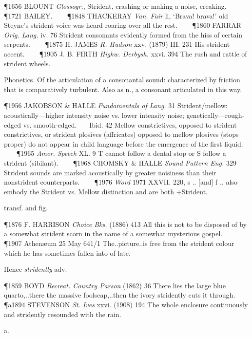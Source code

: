 \begin{description}[wide, labelwidth=!, labelindent=0pt]
\begin{myenumerate}
\P 1656 BLOUNT  \textit{Glossogr.}, Strident, crashing or making a noise, creaking.    
\P 1721 BAILEY.    
\P 1848 THACKERAY  \textit{Van. Fair} li, ‘Brava! brava!’ old Steyne's strident voice was heard roaring over all the rest.    
\P 1860 FARRAR  \textit{Orig. Lang.} iv. 76 Strident consonants evidently formed from the hiss of certain serpents.    
\P 1875 H. JAMES  \textit{R. Hudson} xxv. (1879) III. 231 His strident accent.    
\P 1905 J. B. FIRTH  \textit{Highw. Derbysh.} xxvi. 394 The rush and rattle of strident wheels.

 Phonetics. Of the articulation of a consonantal sound: characterized by friction that is comparatively turbulent. Also as n., a consonant articulated in this way.

\P 1956 JAKOBSON \& HALLE  \textit{Fundamentals of Lang.} 31 Strident/mellow: acoustically—higher intensity noise vs. lower intensity noise; genetically—rough-edged vs. smooth-edged.    Ibid. 42 Mellow constrictives, opposed to strident constrictives, or strident plosives (affricates) opposed to mellow plosives (stops proper) do not appear in child language before the emergence of the first liquid.    
\P 1965  \textit{Amer. Speech} XL. 9 T cannot follow a dental stop or S follow a strident (sibilant).    
\P 1968 CHOMSKY \& HALLE  \textit{Sound Pattern Eng.} 329 Strident sounds are marked acoustically by greater noisiness than their nonstrident counterparts.    
\P 1976 \textit{Word} 1971 XXVII.  220, s .. [and] f .. also embody the Strident vs. Mellow distinction and are both +Strident.

 transf. and fig.

\P 1876 F. HARRISON  \textit{Choice Bks.} (1886) 413 All this is not to be disposed of by a somewhat strident scorn in the name of a somewhat mysterious gospel.    
\P 1907 Athenæum  25 May 641/1 The..picture..is free from the strident colour which he has sometimes fallen into of late.

\noindent Hence \textit{stridently} adv.

\P 1859 BOYD  \textit{Recreat. Country Parson} (1862) 36 There lies the large blue quarto,..there the massive foolscap,..then the ivory stridently cuts it through.    
\P a1894 STEVENSON  \textit{St. Ives} xxvi. (1908) 194 The whole enclosure continuously and stridently resounded with the rain.
\end{myenumerate}


 a.


\end{description}
